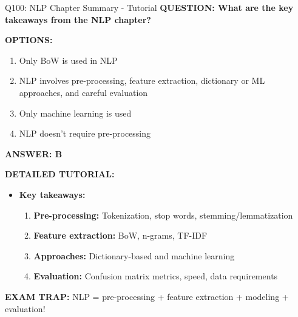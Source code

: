 \documentclass[8pt]{beamer}
\begin{document}
	\begin{frame}{Q100: NLP Chapter Summary - Tutorial}
		\fontsize{6.5}{7.5}\selectfont
		\textbf{QUESTION: What are the key takeaways from the NLP chapter?}
		
		\vspace{0.1cm}
		\textbf{OPTIONS:}
		\begin{enumerate}
			\item Only BoW is used in NLP
			\item NLP involves pre-processing, feature extraction, dictionary or ML approaches, and careful evaluation
			\item Only machine learning is used
			\item NLP doesn't require pre-processing
		\end{enumerate}
		
		\vspace{0.1cm}
		\textcolor{myblue}{\textbf{ANSWER: B}}
		
		\vspace{0.1cm}
		\textbf{DETAILED TUTORIAL:}
		\begin{itemize}
			\item \textbf{Key takeaways:}
			\begin{enumerate}
				\item \textbf{Pre-processing:} Tokenization, stop words, stemming/lemmatization
				\item \textbf{Feature extraction:} BoW, n-grams, TF-IDF
				\item \textbf{Approaches:} Dictionary-based and machine learning
				\item \textbf{Evaluation:} Confusion matrix metrics, speed, data requirements
			\end{enumerate}
		\end{itemize}
		
		\textcolor{myred}{\textbf{EXAM TRAP:}} NLP = \textcolor{myblue}{pre-processing + feature extraction + modeling + evaluation}!
	\end{frame}
	
	
\end{document}
